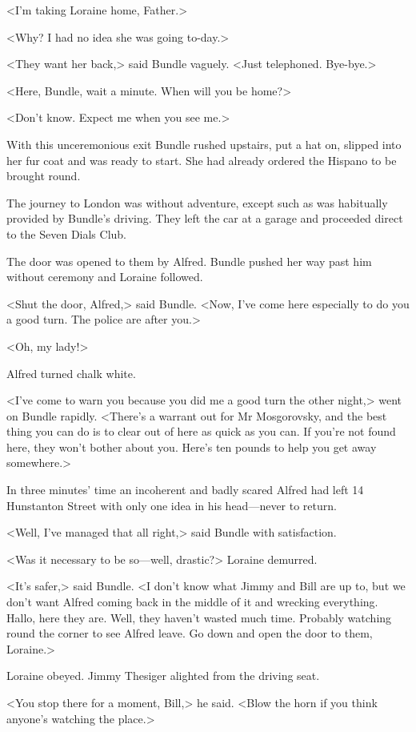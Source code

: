 <I'm taking Loraine home, Father.>

<Why? I had no idea she was going to-day.>

<They want her back,> said Bundle vaguely. <Just telephoned. Bye-bye.>

<Here, Bundle, wait a minute. When will you be home?>

<Don't know. Expect me when you see me.>

With this unceremonious exit Bundle rushed upstairs, put a hat on, slipped into her fur coat and was ready to start. She had already ordered the Hispano to be brought round.

The journey to London was without adventure, except such as was habitually provided by Bundle's driving. They left the car at a garage and proceeded direct to the Seven Dials Club.

The door was opened to them by Alfred. Bundle pushed her way past him without ceremony and Loraine followed.

<Shut the door, Alfred,> said Bundle. <Now, I've come here especially to do you a good turn. The police are after you.>

<Oh, my lady!>

Alfred turned chalk white.

<I've come to warn you because you did me a good turn the other night,> went on Bundle rapidly. <There's a warrant out for Mr Mosgorovsky, and the best thing you can do is to clear out of here as quick as you can. If you're not found here, they won't bother about you. Here's ten pounds to help you get away somewhere.>

In three minutes' time an incoherent and badly scared Alfred had left 14 Hunstanton Street with only one idea in his head—never to return.

<Well, I've managed that all right,> said Bundle with satisfaction.

<Was it necessary to be so—well, drastic?> Loraine demurred.

<It's safer,> said Bundle. <I don't know what Jimmy and Bill are up to, but we don't want Alfred coming back in the middle of it and wrecking everything. Hallo, here they are. Well, they haven't wasted much time. Probably watching round the corner to see Alfred leave. Go down and open the door to them, Loraine.>

Loraine obeyed. Jimmy Thesiger alighted from the driving seat.

<You stop there for a moment, Bill,> he said. <Blow the horn if you think anyone's watching the place.>

